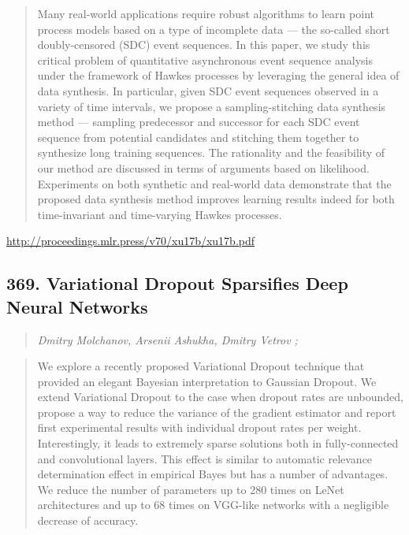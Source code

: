 \documentclass{article}
\begin{document}
\begin{quote}
    Many real-world applications require robust algorithms to learn point process models based on a type of incomplete data — the so-called short doubly-censored (SDC) event sequences. In this paper, we study this critical problem of quantitative asynchronous event sequence analysis under the framework of Hawkes processes by leveraging the general idea of data synthesis. In particular, given SDC event sequences observed in a variety of time intervals, we propose a sampling-stitching data synthesis method — sampling predecessor and successor for each SDC event sequence from potential candidates and stitching them together to synthesize long training sequences. The rationality and the feasibility of our method are discussed in terms of arguments based on likelihood. Experiments on both synthetic and real-world data demonstrate that the proposed data synthesis method improves learning results indeed for both time-invariant and time-varying Hawkes processes.  
\end{quote}

\href{http://proceedings.mlr.press/v70/xu17b/xu17b.pdf}{http://proceedings.mlr.press/v70/xu17b/xu17b.pdf}

\subsection{369. Variational Dropout Sparsifies Deep Neural Networks}

\begin{quote}
\footnotesize{\textit{Dmitry Molchanov, Arsenii Ashukha, Dmitry Vetrov ;}}

\end{quote}

\begin{quote}
    We explore a recently proposed Variational Dropout technique that provided an elegant Bayesian interpretation to Gaussian Dropout. We extend Variational Dropout to the case when dropout rates are unbounded, propose a way to reduce the variance of the gradient estimator and report first experimental results with individual dropout rates per weight. Interestingly, it leads to extremely sparse solutions both in fully-connected and convolutional layers. This effect is similar to automatic relevance determination effect in empirical Bayes but has a number of advantages. We reduce the number of parameters up to 280 times on LeNet architectures and up to 68 times on VGG-like networks with a negligible decrease of accuracy.  
\end{quote}
\end{document}
